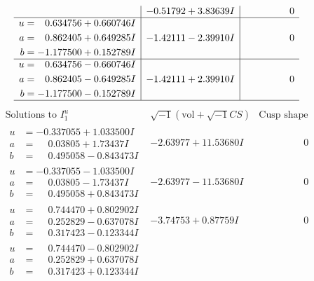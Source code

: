 \documentclass[1p]{elsarticle_modified}
\theoremstyle{definition}
\newcommand{\I}{\sqrt{-1}}
\begin{document}
$$\begin{array}{c|c|c}
 & -0.51792 + 3.83639 I & \phantom{-0.000000 } 0 \\ \hline\begin{aligned}
u &= \phantom{-}0.634756 + 0.660746 I \\
a &= \phantom{-}0.862405 + 0.649285 I \\
b &= -1.177500 + 0.152789 I\end{aligned}
 & -1.42111 - 2.39910 I & \phantom{-0.000000 } 0 \\ \hline\begin{aligned}
u &= \phantom{-}0.634756 - 0.660746 I \\
a &= \phantom{-}0.862405 - 0.649285 I \\
b &= -1.177500 - 0.152789 I\end{aligned}
 & -1.42111 + 2.39910 I & \phantom{-0.000000 } 0\\
 \hline 
 \end{array}$$\newpage$$\begin{array}{c|c|c}  
\text{Solutions to }I^u_{1}& \I (\text{vol} + \sqrt{-1}CS) & \text{Cusp shape}\\
 \hline 
\begin{aligned}
u &= -0.337055 + 1.033500 I \\
a &= \phantom{-}0.03805 + 1.73437 I \\
b &= \phantom{-}0.495058 - 0.843473 I\end{aligned}
 & -2.63977 + 11.53680 I & \phantom{-0.000000 } 0 \\ \hline\begin{aligned}
u &= -0.337055 - 1.033500 I \\
a &= \phantom{-}0.03805 - 1.73437 I \\
b &= \phantom{-}0.495058 + 0.843473 I\end{aligned}
 & -2.63977 - 11.53680 I & \phantom{-0.000000 } 0 \\ \hline\begin{aligned}
u &= \phantom{-}0.744470 + 0.802902 I \\
a &= \phantom{-}0.252829 - 0.637078 I \\
b &= \phantom{-}0.317423 - 0.123344 I\end{aligned}
 & -3.74753 + 0.87759 I & \phantom{-0.000000 } 0 \\ \hline\begin{aligned}
u &= \phantom{-}0.744470 - 0.802902 I \\
a &= \phantom{-}0.252829 + 0.637078 I \\
b &= \phantom{-}0.317423 + 0.123344 I\end{aligned}

\end{array}$$
\end{document}
